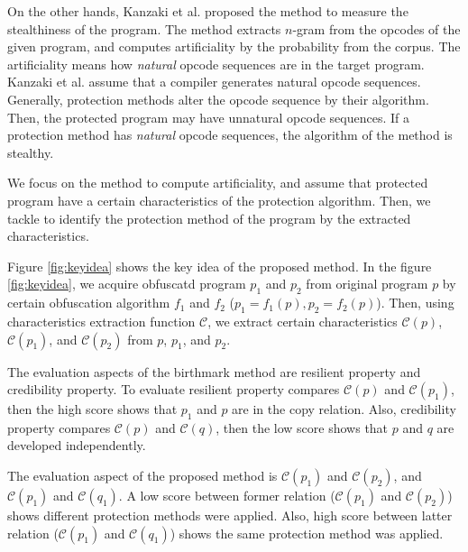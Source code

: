 \documentclass[conference]{IEEEtran}
\newcommand{\birth}[1]{\mathcal{C}(#1)}
\begin{document}
On the other hands, Kanzaki et al. proposed the method to measure the
stealthiness of the program\cite{kanzaki14ipsj}. The method extracts
$n$-gram from the opcodes of the given program, and computes
artificiality by the probability from the corpus.  The artificiality
means how {\em natural} opcode sequences are in the target program.
Kanzaki et al. assume that a compiler generates natural opcode
sequences.  Generally, protection methods alter the opcode sequence by
their algorithm.  Then, the protected program may have unnatural
opcode sequences.  If a protection method has {\em natural} opcode
sequences, the algorithm of the method is stealthy.

We focus on the method to compute artificiality, and assume that
protected program have a certain characteristics of the protection
algorithm.  Then, we tackle to identify the protection method of the
program by the extracted characteristics.

Figure \ref{fig:keyidea} shows the key idea of the proposed method.
In the figure \ref{fig:keyidea}, we acquire obfuscatd program $p_1$
and $p_2$ from original program $p$ by certain obfuscation algorithm
$f_1$ and $f_2$ ($p_1 = f_1(p), p_2 = f_2(p)$).  Then, using
characteristics extraction function $\mathcal{C}$, we extract certain
characteristics $\birth{p}$, $\birth{p_1}$, and $\birth{p_2}$ from
$p$, $p_1$, and $p_2$.

The evaluation aspects of the birthmark method are resilient property
and credibility property.  To evaluate resilient property compares
$\birth{p}$ and $\birth{p_1}$, then the high score shows that $p_1$
and $p$ are in the copy relation.  Also, credibility property compares
$\birth{p}$ and $\birth{q}$, then the low score shows that $p$ and $q$
are developed independently.

The evaluation aspect of the proposed method is $\birth{p_1}$ and
$\birth{p_2}$, and $\birth{p_1}$ and $\birth{q_1}$.  A low score
between former relation ($\birth{p_1}$ and $\birth{p_2}$) shows
different protection methods were applied.  Also, high score between
latter relation ($\birth{p_1}$ and $\birth{q_1}$) shows the same
protection method was applied.
\end{document}

